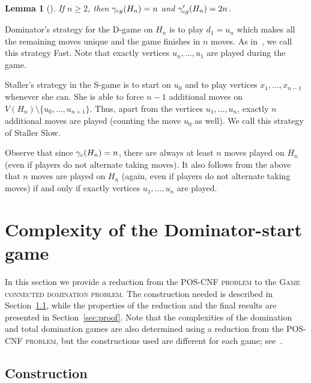 \documentclass[12pt]{article}
\newtheorem{lemma}[theorem]{Lemma}
\newcommand{\gcg}{\gamma_{\rm cg}}
\newcommand{\fast}{{\sc Fast}}
\newcommand{\slow}{{\sc Slow}}
\begin{document}
\begin{lemma}[{\cite{bujtas+2021connected}}]
	\label{lem:Hn}
	If $n \geq 2$, then $\gcg(H_n) = n$ and $\gcg'(H_n) = 2n$.
\end{lemma}

Dominator's strategy for the D-game on $H_n$ is to play $d_1 = u_n$ which makes all the remaining moves unique and the game finishes in $n$ moves. As in~\cite{bujtas+2021connected}, we call this strategy \fast. Note that exactly vertices $u_n, \ldots, u_1$ are played during the game. 

Staller's strategy in the S-game is to start on $u_0$ and to play vertices $x_1, \ldots, x_{n-1}$ whenever she can. She is able to force $n-1$ additional moves on $V(H_n) \setminus \{ u_0, \ldots, u_{n+1} \}$. Thus, apart from the vertices $u_1, \ldots, u_n$, exactly $n$ additional moves are played (counting the move $u_0$ as well). We call this strategy of Staller \slow. 

Observe that since $\gamma_{\rm c}(H_n) = n$, there are always at least $n$ moves played on $H_n$ (even if players do not alternate taking moves). It also follows from the above that $n$ moves are played on $H_n$ (again, even if players do not alternate taking moves) if and only if exactly vertices $u_1, \ldots, u_n$ are played. 



\section{Complexity of the Dominator-start game}
\label{sec:D-game}

In this section we provide a reduction from the \textsc{POS-CNF problem} to the \textsc{Game connected domination problem}. The construction needed is described in Section~\ref{sec:construction}, while the properties of the reduction and the final results are presented in Section~\ref{sec:proof}. Note that the complexities of the domination and total domination games are also determined using a reduction from the \textsc{POS-CNF problem}, but the constructions used are different for each game; see~\cite{bresar+2016PSPACE2, bresar+2017pspace}.

\subsection{Construction}
\label{sec:construction}
\end{document}
